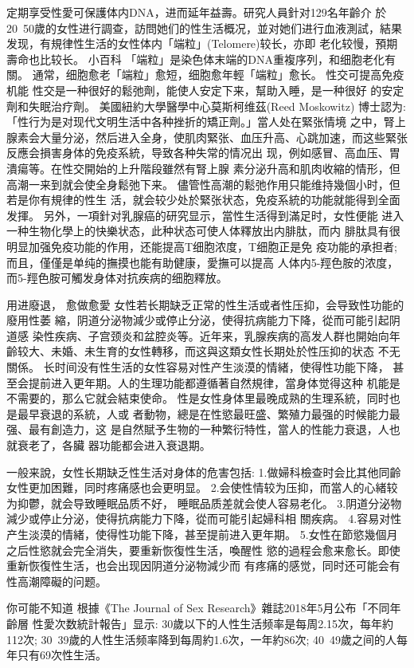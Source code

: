 \documentclass[12pt,UTF8]{ctexbook}
\begin{document}
定期享受性愛可保護体内DNA，进而延年益壽。研究人員針对129名年齡介
於20~50歲的女性进行調查，訪問她们的性生活概况，並对她们进行血液測試，結果发现，有規律性生活的女性体内「端粒」(Telomere)较长，亦即
老化较慢，預期壽命也比较长。
小百科
「端粒」是染色体末端的DNA重複序列，和细胞老化有關。
通常，细胞愈老「端粒」愈短，细胞愈年輕「端粒」愈长。
性交可提高免疫机能
性交是一种很好的鬆弛劑，能使人安定下来，幫助入睡，是一种很好
的安定劑和失眠治疗劑。
美國紐約大學醫學中心莫斯柯维茲(Reed Moskowitz) 博士認为:
「性行为是对现代文明生活中各种挫折的矯正劑。」當人处在緊张情境
之中，腎上腺素会大量分泌，然后进入全身，使肌肉緊张、血压升高、心跳加速，而这些緊张反應会損害身体的免疫系統，导致各种失常的情况出
现，例如感冒、高血压、胃潰瘍等。在性交開始的上升階段雖然有腎上腺
素分泌升高和肌肉收縮的情形，但高潮一来到就会使全身鬆弛下来。
儘管性高潮的鬆弛作用只能维持幾個小时，但若是你有規律的性生
活，就会较少处於緊张状态，免疫系統的功能就能得到全面发揮。
另外，一項針对乳腺癌的研究显示，當性生活得到滿足时，女性便能
进入一种生物化學上的快樂状态，此种状态可使人体釋放出内腓肽，而内
腓肽具有很明显加强免疫功能的作用，还能提高T细胞浓度，T细胞正是免
疫功能的承担者;而且，僅僅是单纯的撫摸也能有助健康，愛撫可以提高
人体内5-羥色胺的浓度，而5-羥色胺可觸发身体对抗疾病的细胞釋放。

用进廢退，
愈做愈愛
女性若长期缺乏正常的性生活或者性压抑，会导致性功能的廢用性萎
縮，阴道分泌物減少或停止分泌，使得抗病能力下降，從而可能引起阴道感
染性疾病、子宫颈炎和盆腔炎等。近年来，乳腺疾病的高发人群也開始向年
齡较大、未婚、未生育的女性轉移，而这與这類女性长期处於性压抑的状态
不无關係。
长时间没有性生活的女性容易对性产生淡漠的情緒，使得性功能下降，
甚至会提前进入更年期。人的生理功能都遵循著自然規律，當身体觉得这种
机能是不需要的，那么它就会結束使命。
性是女性身体里最晚成熟的生理系統，同时也是最早衰退的系統，人或
者動物，總是在性慾最旺盛、繁殖力最强的时候能力最强、最有創造力，这
是自然賦予生物的一种繁衍特性，當人的性能力衰退，人也就衰老了，各臟
器功能都会进入衰退期。

一般来說，女性长期缺乏性生活对身体的危害包括:
1.做婦科檢查时会比其他同齡女性更加困難，同时疼痛感也会更明显。
2.会使性情较为压抑，而當人的心緒较为抑鬱，就会导致睡眠品质不好，
睡眠品质差就会使人容易老化。
3.阴道分泌物減少或停止分泌，使得抗病能力下降，從而可能引起婦科相
關疾病。
4.容易对性产生淡漠的情緒，使得性功能下降，甚至提前进入更年期。
5.女性在節慾幾個月之后性慾就会完全消失，要重新恢復性生活，喚醒性
慾的過程会愈来愈长。即使重新恢復性生活，也会出现因阴道分泌物減少而
有疼痛的感觉，同时还可能会有性高潮障礙的问题。

你可能不知道
根據《The Journal of Sex Research》雜誌2018年5月公布「不同年齡層
性愛次数統計報告」显示:
30歲以下的人性生活频率是每周2.15次，每年約112次;
30~39歲的人性生活频率降到每周約1.6次，一年約86次;
40~49歲之间的人每年只有69次性生活。
\end{document}
